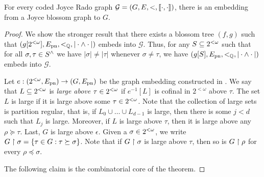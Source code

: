 \begin{theorem}[$\ACA_0$]\label{thm:blossom-to-joyce-rado}
For every coded Joyce Rado graph $\mathcal{G}=(G,E,<,\llbracket \cdot , \cdot \rrbracket)$,
there is an embedding from a Joyce blossom graph to $G$.%
\end{theorem}
\begin{proof}
We show the stronger result that there exists a blossom tree $(f,g)$ such that $(g[{2^{<\omega}}],E_{\mathrm{pn}},<_{\mathbb{Q}},|\cdot\wedge\cdot|)$ embeds into $\mathcal{G}$. Thus, for any $S\subseteq{2^{<\omega}}$ such that for all $\sigma,\tau\in {S}^{\wedge}$ we have $|\sigma|\neq|\tau|$ whenever $\sigma\neq\tau$, we have $(g[S],E_{\mathrm{pn}},<_{\mathbb{Q}},|\cdot\wedge\cdot|)$ embeds into $\mathcal{G}$. 
  
Let $e: ({2^{<\omega}}, E_{\mathrm{pn}}) \to (G, E_{\mathrm{pn}})$ be the graph embedding constructed in .
We say that $L \subseteq {2^{<\omega}}$ is \emph{large above $\tau \in {2^{<\omega}}$}
if $e^{-1}[L]$ is cofinal in $2^{<\omega}$ above $\tau$. The set $L$ is large if it is large above some $\tau \in {2^{<\omega}}$. Note that the collection of large sets is partition regular, that is, if $L_0 \cup \dots \cup L_{d-1}$ is large, then there is some $j < d$ such that $L_j$ is large. Moreover, if $L$ is large above $\tau$, then it is large above any $\rho \succeq \tau$. Last, $G$ is large above $\epsilon$.
Given a $\sigma \in {2^{<\omega}}$, we write $G \upharpoonright \sigma = \{ \tau \in G: \tau \succeq \sigma \}$.
Note that if $G \upharpoonright \sigma$ is large above $\tau$, then so is $G \upharpoonright \rho$ for every $\rho \preceq \sigma$.

The following claim is the combinatorial core of the theorem.


\end{proof}
